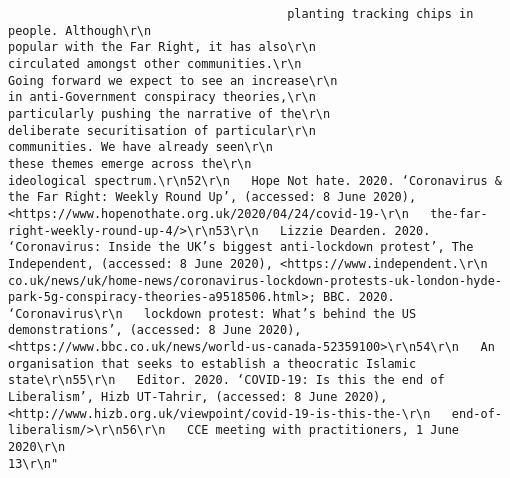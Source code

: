 \documentclass[
]{book}
\begin{document}
\begin{verbatim}
                                       planting tracking chips in people. Although\r\n                                                                                       popular with the Far Right, it has also\r\n                                                                                       circulated amongst other communities.\r\n                                                                                   Going forward we expect to see an increase\r\n                                                                                   in anti-Government conspiracy theories,\r\n                                                                                   particularly pushing the narrative of the\r\n                                                                                   deliberate securitisation of particular\r\n                                                                                   communities. We have already seen\r\n                                                                                   these themes emerge across the\r\n                                                                                   ideological spectrum.\r\n52\r\n   Hope Not hate. 2020. ‘Coronavirus & the Far Right: Weekly Round Up’, (accessed: 8 June 2020), <https://www.hopenothate.org.uk/2020/04/24/covid-19-\r\n   the-far-right-weekly-round-up-4/>\r\n53\r\n   Lizzie Dearden. 2020. ‘Coronavirus: Inside the UK’s biggest anti-lockdown protest’, The Independent, (accessed: 8 June 2020), <https://www.independent.\r\n   co.uk/news/uk/home-news/coronavirus-lockdown-protests-uk-london-hyde-park-5g-conspiracy-theories-a9518506.html>; BBC. 2020. ‘Coronavirus\r\n   lockdown protest: What’s behind the US demonstrations’, (accessed: 8 June 2020), <https://www.bbc.co.uk/news/world-us-canada-52359100>\r\n54\r\n   An organisation that seeks to establish a theocratic Islamic state\r\n55\r\n   Editor. 2020. ‘COVID-19: Is this the end of Liberalism’, Hizb UT-Tahrir, (accessed: 8 June 2020), <http://www.hizb.org.uk/viewpoint/covid-19-is-this-the-\r\n   end-of-liberalism/>\r\n56\r\n   CCE meeting with practitioners, 1 June 2020\r\n                                                                                13\r\n"                                                                                                                                                                                                                                                                                                                                                                                                                                              

\end{verbatim}
\end{document}
